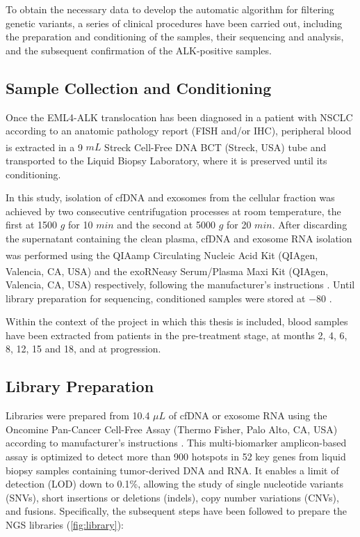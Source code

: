 To obtain the necessary data to develop the automatic algorithm for filtering genetic variants, a series of clinical procedures have been carried out, including the preparation and conditioning of the samples, their sequencing and analysis, and the subsequent confirmation of the ALK-positive samples.

\subsection{Sample Collection and Conditioning}

Once the EML4-ALK translocation has been diagnosed in a patient with NSCLC according to an anatomic pathology report (FISH and\slash or IHC), peripheral blood is extracted in a 9 $mL$ Streck Cell-Free DNA BCT\textsuperscript\textregistered{} (Streck, USA) tube and transported to the Liquid Biopsy Laboratory, where it is preserved until its conditioning.

In this study, isolation of cfDNA and exosomes from the cellular fraction was achieved by two consecutive centrifugation processes at room temperature, the first at 1500 $g$ for 10 $min$ and the second at 5000 $g$ for 20 $min$. After discarding the supernatant containing the clean plasma, cfDNA and exosome RNA isolation was performed using the QIAamp\textsuperscript\textregistered{} Circulating Nucleic Acid Kit (QIAgen, Valencia, CA, USA) and the exoRNeasy\textsuperscript\textregistered{} Serum/Plasma Maxi Kit (QIAgen, Valencia, CA, USA) respectively, following the manufacturer's instructions \cite{QUIAGEN_cfDNA, QUIAGEN_exosomes}. Until library preparation for sequencing, conditioned samples were stored at $-80$ .

Within the context of the project in which this thesis is included, blood samples have been extracted from patients in the pre-treatment stage, at months 2, 4, 6, 8, 12, 15 and 18, and at progression.

\subsection{Library Preparation}

Libraries were prepared from 10.4 $\mu L$ of cfDNA or exosome RNA using the Oncomine\texttrademark{} Pan-Cancer Cell-Free Assay (Thermo Fisher, Palo Alto, CA, USA) according to manufacturer's instructions \cite{Oncomine_PanCancer}. This multi-biomarker amplicon-based assay is optimized to detect more than 900 hotspots in 52 key genes from liquid biopsy samples containing tumor-derived DNA and RNA. It enables a limit of detection (LOD) down to 0.1\%, allowing the study of single nucleotide variants (SNVs), short insertions or deletions (indels), copy number variations (CNVs), and fusions. Specifically, the subsequent steps have been followed to prepare the NGS libraries (\autoref{fig:library}):

